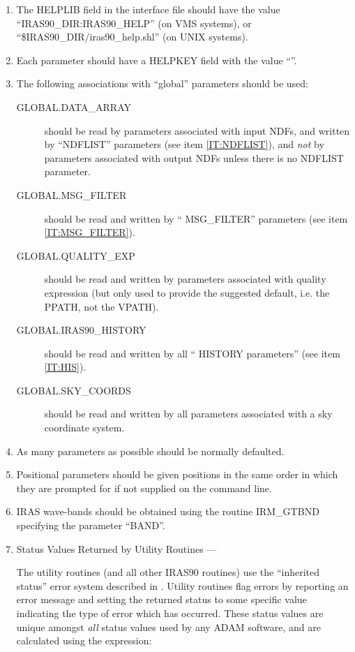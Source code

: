\begin{enumerate}
\item The {\small HELPLIB} field in the interface file should have the value
``{\small IRAS90\_DIR:IRAS90\_HELP}'' (on {\small VMS} systems), or 
``{\small \$IRAS90\_DIR/iras90\_help.shl}'' (on {\small UNIX} systems).

\item Each parameter should have a {\small HELPKEY} field with the value 
``\lsk''.

\item The following associations with ``global'' parameters should be used:
\begin{description}
\item [GLOBAL.DATA\_ARRAY ] should be read by parameters associated with input
{\small NDF}s, and written by ``{\small NDFLIST}'' parameters (see item
\ref{IT:NDFLIST}), and {\em not} by parameters associated with output {\small
NDF}s unless there is no {\small NDFLIST} parameter. 
\item [GLOBAL.MSG\_FILTER ] should be read and written by ``{\small 
MSG\_FILTER}'' parameters (see item \ref{IT:MSG_FILTER}).
\item [GLOBAL.QUALITY\_EXP ] should be read and written by parameters associated
with quality expression (but only used to provide the suggested default, i.e.
the {\small PPATH}, not the {\small VPATH}). 
\item [GLOBAL.IRAS90\_HISTORY] should be read and written by all ``{\small 
HISTORY} parameters'' (see item \ref{IT:HIS}).
\item [GLOBAL.SKY\_COORDS] should be read and written by all parameters 
associated with a sky coordinate system.
\end{description}

\item As many parameters as possible should be normally defaulted.

\item Positional parameters should be given positions in the same order in which
they are prompted for if not supplied on the command line. 

\item {\small IRAS} wave-bands should be obtained using the routine {\small
IRM\_GTBND} specifying the parameter ``{\small BAND}''. 

\item Status Values Returned by Utility Routines ---

The utility routines (and all other {\small IRAS90} routines) use the 
``inherited status'' error system described in 
. Utility routines flag 
errors by reporting an error message and setting the returned status to some 
specific value indicating the type of error which has occurred. These status 
values are unique amongst {\em all} status values used by any {\small ADAM} 
software, and are calculated using the expression:


\end{enumerate}
